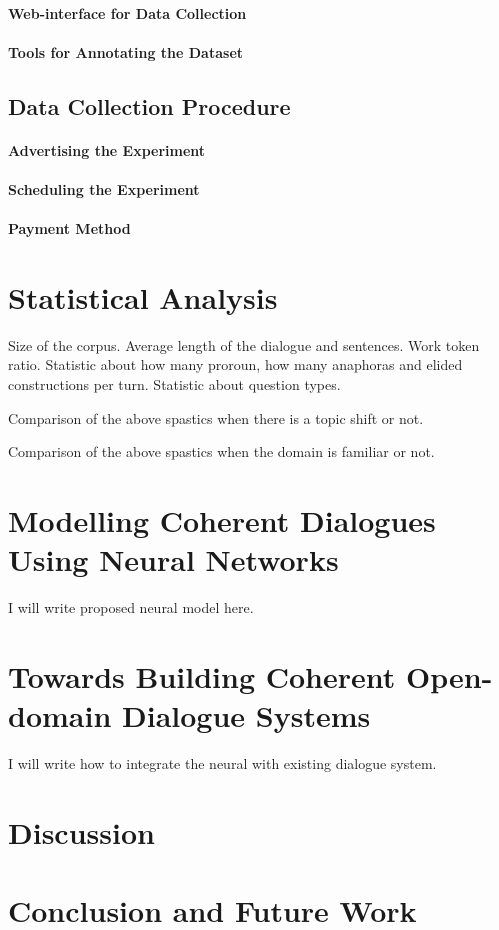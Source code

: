 \documentclass[bsc,frontabs,twoside,singlespacing,parskip,deptreport]{infthesis}     %
\begin{document}
\subsubsection*{Web-interface for Data Collection}

\subsubsection*{Tools for Annotating the Dataset}

\section{Data Collection Procedure}
\subsubsection*{Advertising the Experiment}
\subsubsection*{Scheduling the Experiment}
\subsubsection*{Payment Method}

\chapter{Statistical Analysis}

Size of the corpus.
Average length of the dialogue and sentences.
Work token ratio.
Statistic about how many proroun, how many anaphoras and elided constructions per turn.
Statistic about question types.

Comparison of the above spastics when there is a topic shift or not.

Comparison of the above spastics when the domain is familiar or not.

\chapter{Modelling Coherent Dialogues Using Neural Networks}
I will write proposed neural model here.

\chapter{Towards Building Coherent Open-domain Dialogue Systems}
I will write how to integrate the neural with existing dialogue system. 

\chapter{Discussion}

\chapter{Conclusion and Future Work}





\end{document}
